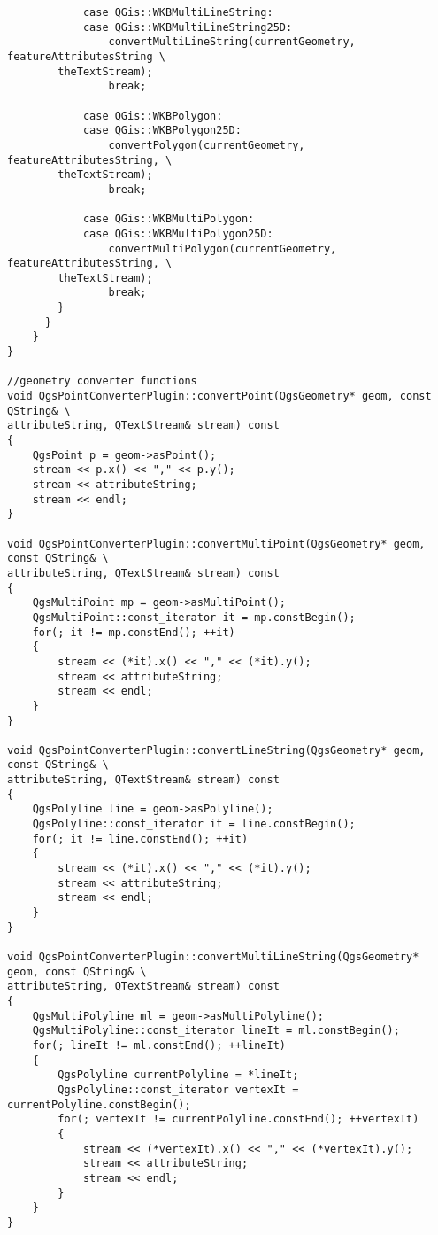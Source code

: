 \begin{verbatim}
            case QGis::WKBMultiLineString:
            case QGis::WKBMultiLineString25D:
                convertMultiLineString(currentGeometry, featureAttributesString \
		theTextStream);
                break;

            case QGis::WKBPolygon:
            case QGis::WKBPolygon25D:
                convertPolygon(currentGeometry, featureAttributesString, \
		theTextStream);
                break;

            case QGis::WKBMultiPolygon:
            case QGis::WKBMultiPolygon25D:
                convertMultiPolygon(currentGeometry, featureAttributesString, \
		theTextStream);
                break;
        }
      }
    }
}

//geometry converter functions
void QgsPointConverterPlugin::convertPoint(QgsGeometry* geom, const QString& \
attributeString, QTextStream& stream) const
{
    QgsPoint p = geom->asPoint();
    stream << p.x() << "," << p.y();
    stream << attributeString;
    stream << endl;
}

void QgsPointConverterPlugin::convertMultiPoint(QgsGeometry* geom, const QString& \
attributeString, QTextStream& stream) const
{
    QgsMultiPoint mp = geom->asMultiPoint();
    QgsMultiPoint::const_iterator it = mp.constBegin();
    for(; it != mp.constEnd(); ++it)
    {
        stream << (*it).x() << "," << (*it).y();
        stream << attributeString;
        stream << endl;
    }
}

void QgsPointConverterPlugin::convertLineString(QgsGeometry* geom, const QString& \
attributeString, QTextStream& stream) const
{
    QgsPolyline line = geom->asPolyline();
    QgsPolyline::const_iterator it = line.constBegin();
    for(; it != line.constEnd(); ++it)
    {
        stream << (*it).x() << "," << (*it).y();
        stream << attributeString;
        stream << endl;
    }
}

void QgsPointConverterPlugin::convertMultiLineString(QgsGeometry* geom, const QString& \
attributeString, QTextStream& stream) const
{
    QgsMultiPolyline ml = geom->asMultiPolyline();
    QgsMultiPolyline::const_iterator lineIt = ml.constBegin();
    for(; lineIt != ml.constEnd(); ++lineIt)
    {
        QgsPolyline currentPolyline = *lineIt;
        QgsPolyline::const_iterator vertexIt = currentPolyline.constBegin();
        for(; vertexIt != currentPolyline.constEnd(); ++vertexIt)
        {
            stream << (*vertexIt).x() << "," << (*vertexIt).y();
            stream << attributeString;
            stream << endl;
        }
    }
}


\end{verbatim}
